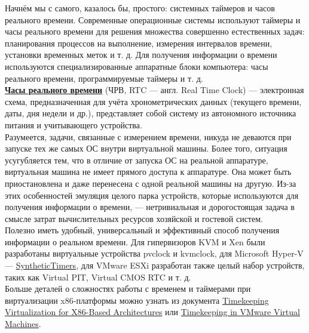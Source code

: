 \documentclass[14pt, a4paper]{article}
\begin{document}
Начнём мы с самого, казалось бы, простого: системных таймеров и часов реального времени.
Современные операционные системы используют таймеры и часы реального времени для решения
множества совершенно естественных задач: планирования процессов на выполнение, измерения
интервалов времени, установки временных меток и т. д. Для получения информации о времени
используются специализированные аппаратные блоки компьютера: часы реального времени,
программируемые таймеры и т. д.\\

\href{https://ru.wikipedia.org/wiki/Часы_реального_времени}{\textbf{Часы реального времени}} (ЧРВ, RTC — англ. Real Time Clock) — электронная схема, предназначенная
для учёта хронометрических данных (текущего времени, даты, дня недели и др.), представляет собой
систему из автономного источника питания и учитывающего устройства.\\

Разумеется, задачи, связанные с измерением времени, никуда не деваются при запуске тех же самых
ОС внутри виртуальной машины. Более того, ситуация усугубляется тем, что в отличие от запуска ОС
на реальной аппаратуре, виртуальная машина не имеет прямого доступа к аппаратуре. Она может
быть приостановлена и даже перенесена с одной реальной машины на другую. Из-за этих
особенностей эмуляция целого парка устройств, которые используются для получения информации о
времени, — нетривиальная и дорогостоящая задача в смысле затрат вычислительных ресурсов
хозяйской и гостевой систем.\\

Полезно иметь удобный, универсальный и эффективный способ получения информации о реальном
времени. Для гипервизоров KVM и Xen были разработаны виртуальные устройства pvclock и
kvmclock, для Microsoft Hyper-V — \href{https://github.com/MicrosoftDocs/Virtualization-Documentation/raw/master/tlfs/Hypervisor%20Top%20Level%20Functional%20Specification%20v5.0C.pdf}{SyntheticTimers}, 
для VMware ESXi разработан также целый набор
устройств, таких как Virtual PIT, Virtual CMOS RTC и т. д.\\

Больше деталей о сложностях работы с временем и таймерами при виртуализации x86-платформы
можно узнать из документа \href{https://www.kernel.org/doc/Documentation/virtual/kvm/timekeeping.txt}{Timekeeping Virtualization for X86-Based Architectures} 
или \href{https://github.com/MicrosoftDocs/Virtualization-Documentation/raw/master/tlfs/Hypervisor%20Top%20Level%20Functional%20Specification%20v5.0C.pdf}{Timekeeping in VMware Virtual Machines}.\\
\end{document}
